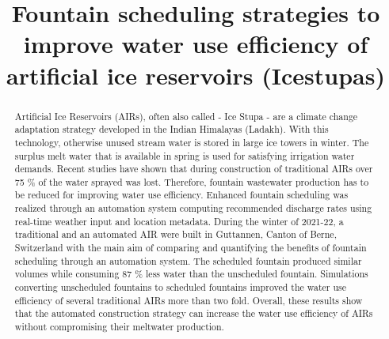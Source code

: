 \documentclass[tc, manuscript]{copernicus}
\begin{document}
\title{Fountain scheduling strategies to improve water use efficiency of artificial
ice reservoirs (Icestupas)}

\def\Authors{Suryanarayanan Balasubramanian\,$^{1,2}$, Martin Hoelzle\,$^{1}$Roger Waser\,$^{3}$, $Martin Von
Burg^{3}\,$}

\def\Address{$^{1}$University of Fribourg, Department of Geosciences, Fribourg, Switzerland $^{2}$University of
Applied Sciences and Arts, Luzern, Switzerland} \def\corrAuthor{Suryanarayanan Balasubramanian}





\maketitle

\begin{abstract}

  Artificial Ice Reservoirs (AIRs), often also called - Ice Stupa - are a climate change adaptation strategy
  developed in the Indian Himalayas (Ladakh). With this technology, otherwise unused stream water is stored in
  large ice towers in winter. The surplus melt water that is available in spring is used for satisfying
  irrigation water demands. Recent studies have shown that during construction of traditional AIRs over 75 \% of
  the water sprayed was lost. Therefore, fountain wastewater production has to be reduced for improving water use
  efficiency. Enhanced fountain scheduling was realized through an automation system computing recommended
  discharge rates using real-time weather input and location metadata. During the winter of 2021-22, a
  traditional and an automated AIR were built in Guttannen, Canton of Berne, Switzerland with the main aim of
  comparing and quantifying the benefits of fountain scheduling through an automation system. The scheduled
  fountain produced similar volumes while consuming 87 \% less water than the unscheduled fountain.
  Simulations converting unscheduled fountains to scheduled fountains improved the water use efficiency of
  several traditional AIRs more than two fold. Overall, these results show that the automated construction
  strategy can increase the water use efficiency of AIRs without compromising their meltwater production.

\end{abstract}
\end{document}
